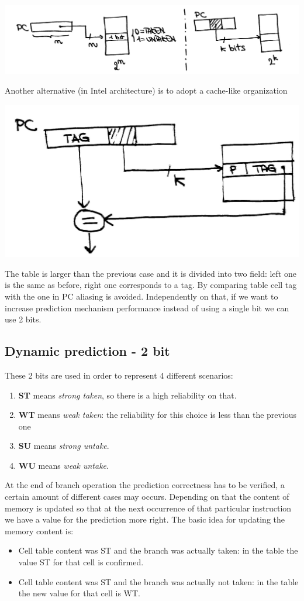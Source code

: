 \begin{center}
  \includegraphics[width=0.75\linewidth]{img/img3/15}
\end{center}

Another alternative (in Intel architecture) is to adopt a cache-like organization
\begin{center}
  \includegraphics[width=0.6\linewidth]{img/img3/16}
\end{center}

The table is larger than the previous case and it is divided into two field: left one is the same as before, right one corresponds to a tag. By comparing table cell tag with the one in PC aliasing is avoided.
Independently on that, if we want to increase prediction mechanism performance instead of using a single bit we can use 2 bits.

\subsection{Dynamic prediction - 2 bit}
These 2 bits are used in order to represent 4 different scenarios:

\begin{enumerate}
  \item \textbf{ST} means \textit{strong taken}, so there is a high reliability on that.
  \item \textbf{WT} means \textit{weak taken}: the reliability for this choice is less than the previous one
  \item \textbf{SU} means \textit{strong untake}.
  \item \textbf{WU} means \textit{weak untake}.
\end{enumerate}


At the end of branch operation the prediction correctness has to be verified, a certain amount of different cases may occurs. Depending on that the content of memory is updated so that at the next occurrence of that particular instruction we have a value for the prediction more right. The basic idea for updating the memory content is:
\begin{itemize}
  \item Cell table content was ST and the branch was actually taken: in the table the value ST for that cell is confirmed.
  \item Cell table content was ST and the branch was actually not taken: in the table the new value for that cell is WT.
\end{itemize}

